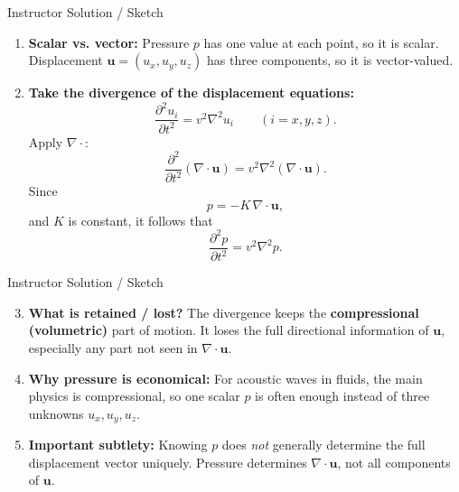 \documentclass{beamer}
\begin{document}
\begin{frame}{Instructor Solution / Sketch}
\small

\begin{enumerate}
    \item \textbf{Scalar vs. vector:}  
    Pressure \(p\) has one value at each point, so it is scalar.  
    Displacement \(\bm{u}=(u_x,u_y,u_z)\) has three components, so it is vector-valued.

    \vspace{0.15cm}

    \item \textbf{Take the divergence of the displacement equations:}
    \[
    \frac{\partial^2 u_i}{\partial t^2}=v^2\nabla^2 u_i
    \qquad (i=x,y,z).
    \]
    Apply \(\nabla\cdot\):
    \[
    \frac{\partial^2}{\partial t^2}(\nabla\cdot\bm{u})
    =
    v^2\nabla^2(\nabla\cdot\bm{u}).
    \]
    Since
    \[
    p=-K\,\nabla\cdot\bm{u},
    \]
    and \(K\) is constant, it follows that
    \[
    \frac{\partial^2 p}{\partial t^2}=v^2\nabla^2 p.
    \]

    \vspace{0.15cm}

\end{enumerate}
\end{frame}

\begin{frame}{Instructor Solution / Sketch}
\small

\begin{enumerate}
    \setcounter{enumi}{2}


    \item \textbf{What is retained / lost?}  
    The divergence keeps the \textbf{compressional (volumetric)} part of motion.  
    It loses the full directional information of \(\bm{u}\), especially any part not seen in \(\nabla\cdot\bm{u}\).

    \vspace{0.15cm}

    \item \textbf{Why pressure is economical:}  
    For acoustic waves in fluids, the main physics is compressional, so one scalar \(p\) is often enough instead of three unknowns \(u_x,u_y,u_z\).

    \vspace{0.15cm}

    \item \textbf{Important subtlety:}  
    Knowing \(p\) does \emph{not} generally determine the full displacement vector uniquely.  
    Pressure determines \(\nabla\cdot\bm{u}\), not all components of \(\bm{u}\).

\end{enumerate}

\end{frame}
\end{document}
